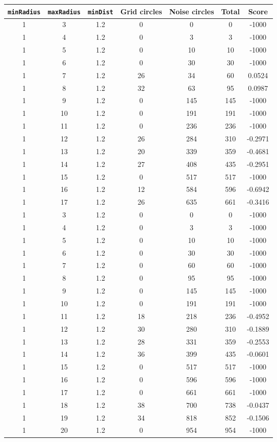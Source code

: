 \documentclass[letterpaper, 12pt]{article}
\begin{document}
\begin{longtable}{|c|c|c|c|c|c|c|}
\hline
\textbf{\texttt{minRadius}} & \textbf{\texttt{maxRadius}} & \textbf{\texttt{minDist}} & \textbf{Grid circles} & \textbf{Noise circles} & \textbf{Total} & \textbf{Score} \\
\hline
1 & 3 & 1.2 & 0 & 0 & 0 & -1000 \\
\hline
1 & 4 & 1.2 & 0 & 3 & 3 & -1000 \\
\hline
1 & 5 & 1.2 & 0 & 10 & 10 & -1000 \\
\hline
1 & 6 & 1.2 & 0 & 30 & 30 & -1000 \\
\hline
1 & 7 & 1.2 & 26 & 34 & 60 & 0.0524 \\
\hline
1 & 8 & 1.2 & 32 & 63 & 95 & 0.0987 \\
\hline
1 & 9 & 1.2 & 0 & 145 & 145 & -1000 \\
\hline
1 & 10 & 1.2 & 0 & 191 & 191 & -1000 \\
\hline
1 & 11 & 1.2 & 0 & 236 & 236 & -1000 \\
\hline
1 & 12 & 1.2 & 26 & 284 & 310 & -0.2971 \\
\hline
1 & 13 & 1.2 & 20 & 339 & 359 & -0.4681 \\
\hline
1 & 14 & 1.2 & 27 & 408 & 435 & -0.2951 \\
\hline
1 & 15 & 1.2 & 0 & 517 & 517 & -1000 \\
\hline
1 & 16 & 1.2 & 12 & 584 & 596 & -0.6942 \\
\hline
1 & 17 & 1.2 & 26 & 635 & 661 & -0.3416 \\
\hline
1 & 3 & 1.2 & 0 & 0 & 0 & -1000 \\
\hline
1 & 4 & 1.2 & 0 & 3 & 3 & -1000 \\
\hline
1 & 5 & 1.2 & 0 & 10 & 10 & -1000 \\
\hline
1 & 6 & 1.2 & 0 & 30 & 30 & -1000 \\
\hline
1 & 7 & 1.2 & 0 & 60 & 60 & -1000 \\
\hline
1 & 8 & 1.2 & 0 & 95 & 95 & -1000 \\
\hline
1 & 9 & 1.2 & 0 & 145 & 145 & -1000 \\
\hline
1 & 10 & 1.2 & 0 & 191 & 191 & -1000 \\
\hline
1 & 11 & 1.2 & 18 & 218 & 236 & -0.4952 \\
\hline
1 & 12 & 1.2 & 30 & 280 & 310 & -0.1889 \\
\hline
1 & 13 & 1.2 & 28 & 331 & 359 & -0.2553 \\
\hline
1 & 14 & 1.2 & 36 & 399 & 435 & -0.0601 \\
\hline
1 & 15 & 1.2 & 0 & 517 & 517 & -1000 \\
\hline
1 & 16 & 1.2 & 0 & 596 & 596 & -1000 \\
\hline
1 & 17 & 1.2 & 0 & 661 & 661 & -1000 \\
\hline
1 & 18 & 1.2 & 38 & 700 & 738 & -0.0437 \\
\hline
1 & 19 & 1.2 & 34 & 818 & 852 & -0.1506 \\
\hline
1 & 20 & 1.2 & 0 & 954 & 954 & -1000 \\
\hline
\end{longtable}
\end{document}
